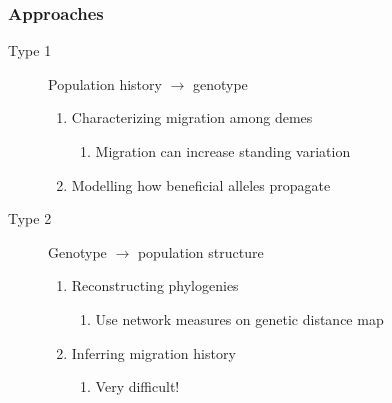 \documentclass{beamer}
\begin{document}
\begin{frame}
  \frametitle{Approaches}
  \begin{description}

    \item[Type 1]{Population history $\rightarrow$ genotype}
      \begin{enumerate}
        \item Characterizing migration among demes
          \begin{enumerate}
            \item Migration can increase standing variation
          \end{enumerate}
        \item Modelling how beneficial alleles propagate
      \end{enumerate}

    \item[Type 2]{Genotype $\rightarrow$ population structure}
      \begin{enumerate}
        \item Reconstructing phylogenies
          \begin{enumerate}
            \item Use network measures on genetic distance map
          \end{enumerate}
        \item Inferring migration history
          \begin{enumerate}
            \item Very difficult!
          \end{enumerate}
      \end{enumerate}

  \end{description}
\end{frame}

\end{document}
